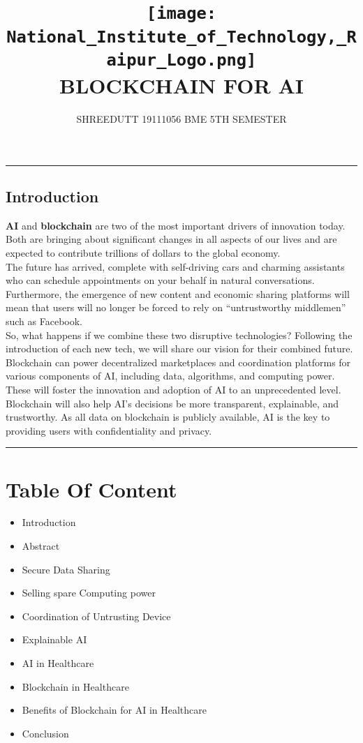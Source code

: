 \documentclass[12pt,letterpaper]{article}
\begin{document}
\title{
\texttt{[image: National\_Institute\_of\_Technology,\_Raipur\_Logo.png]}
\\ 
\textbf{BLOCKCHAIN FOR AI}
}
\author{SHREEDUTT 19111056 BME 5TH SEMESTER}
\maketitle
\rule{\textwidth}{0.1pt}

{\begin{center}
    \section* {Introduction}
\end{center}} 
\textbf{AI} and \textbf{blockchain} are two of the most important drivers of innovation today. Both are bringing about significant changes in all aspects of our lives and are expected to contribute trillions of dollars to the global economy. 
\\
The future has arrived, complete with self-driving cars and charming assistants who can schedule appointments on your behalf in natural conversations. Furthermore, the emergence of new content and economic sharing platforms will mean that users will no longer be forced to rely on “untrustworthy middlemen” such as Facebook. 
\\
So, what happens if we combine these two disruptive technologies? Following the introduction of each new tech, we will share our vision for their combined future.
\\
Blockchain can power decentralized marketplaces and coordination platforms for various components of AI, including data, algorithms, and computing power. These will foster the innovation and adoption of AI to an unprecedented level.
\\ Blockchain will also help AI’s decisions be more transparent, explainable, and trustworthy. As all data on blockchain is publicly available, AI is the key to providing users with confidentiality and privacy.

\rule{\textwidth}{0.1pt}

\section* {Table Of Content}
\begin{itemize}
    \item Introduction
    \item Abstract
    \item Secure Data Sharing
    \item Selling spare Computing power
    \item Coordination of Untrusting Device
    \item Explainable AI
    \item AI in Healthcare 
    \item Blockchain in Healthcare
    \item Benefits of Blockchain for AI in Healthcare
    \item Conclusion
  \end{itemize}
\end{document}
